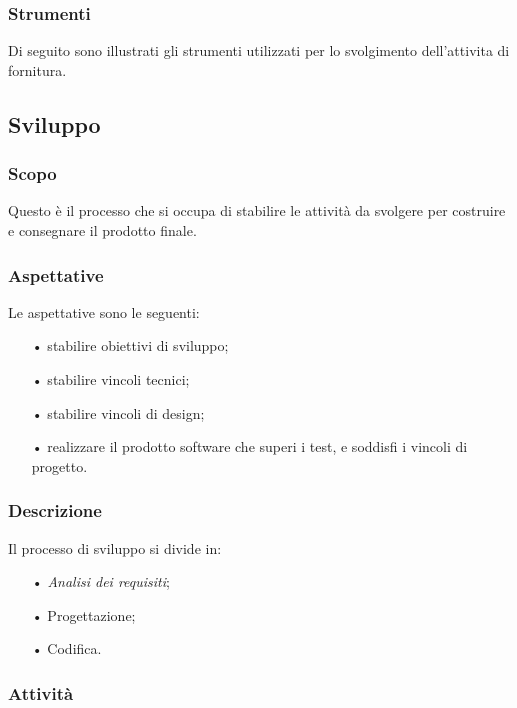 		\subsubsection{Strumenti}
		Di seguito sono illustrati gli strumenti utilizzati per lo svolgimento dell'attivita di fornitura.

	\subsection{Sviluppo}
		\subsubsection{Scopo}Questo è il processo che si occupa di stabilire le attività da svolgere per costruire e consegnare il prodotto finale.
		\subsubsection{Aspettative}
		Le aspettative sono le seguenti:
			\begin{itemize}
				\item[•] stabilire obiettivi di sviluppo;
				\item[•] stabilire vincoli tecnici;
				\item[•] stabilire vincoli di design;
				\item[•] realizzare il prodotto software che superi i test, e soddisfi i vincoli di progetto.
			\end{itemize}
		\subsubsection{Descrizione}
			Il processo di sviluppo si divide in:
				\begin{itemize}
					\item[•] \textit{Analisi dei requisiti};
					\item[•] Progettazione;
					\item[•] Codifica.
				\end{itemize}
		\subsubsection{Attività}
